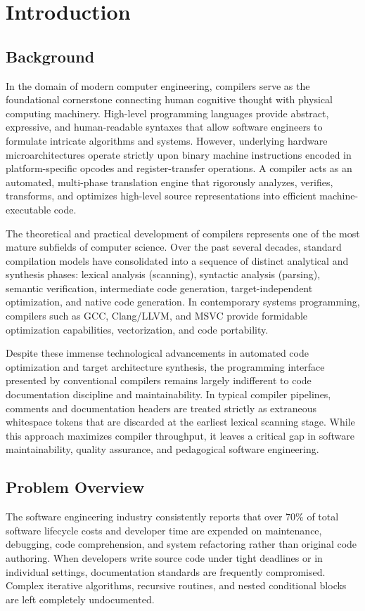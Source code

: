 \chapter{Introduction}\doublespacing

\section{Background}
In the domain of modern computer engineering, compilers serve as the foundational cornerstone connecting human cognitive thought with physical computing machinery. High-level programming languages provide abstract, expressive, and human-readable syntaxes that allow software engineers to formulate intricate algorithms and systems. However, underlying hardware microarchitectures operate strictly upon binary machine instructions encoded in platform-specific opcodes and register-transfer operations. A compiler acts as an automated, multi-phase translation engine that rigorously analyzes, verifies, transforms, and optimizes high-level source representations into efficient machine-executable code.

The theoretical and practical development of compilers represents one of the most mature subfields of computer science. Over the past several decades, standard compilation models have consolidated into a sequence of distinct analytical and synthesis phases: lexical analysis (scanning), syntactic analysis (parsing), semantic verification, intermediate code generation, target-independent optimization, and native code generation. In contemporary systems programming, compilers such as GCC, Clang/LLVM, and MSVC provide formidable optimization capabilities, vectorization, and code portability.

Despite these immense technological advancements in automated code optimization and target architecture synthesis, the programming interface presented by conventional compilers remains largely indifferent to code documentation discipline and maintainability. In typical compiler pipelines, comments and documentation headers are treated strictly as extraneous whitespace tokens that are discarded at the earliest lexical scanning stage. While this approach maximizes compiler throughput, it leaves a critical gap in software maintainability, quality assurance, and pedagogical software engineering.

\section{Problem Overview}
The software engineering industry consistently reports that over 70\% of total software lifecycle costs and developer time are expended on maintenance, debugging, code comprehension, and system refactoring rather than original code authoring. When developers write source code under tight deadlines or in individual settings, documentation standards are frequently compromised. Complex iterative algorithms, recursive routines, and nested conditional blocks are left completely undocumented.


